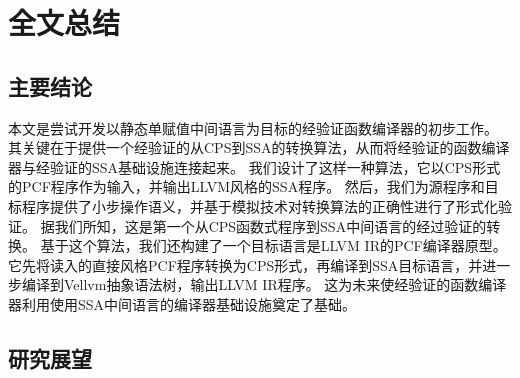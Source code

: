 
\chapter{全文总结} \label{ch:summary}

\section{主要结论}

本文是尝试开发以静态单赋值中间语言为目标的经验证函数编译器的初步工作。
其关键在于提供一个经验证的从CPS到SSA的转换算法，从而将经验证的函数编译器与经验证的SSA基础设施连接起来。
我们设计了这样一种算法，它以CPS形式的PCF程序作为输入，并输出LLVM风格的SSA程序。
然后，我们为源程序和目标程序提供了小步操作语义，并基于模拟技术对转换算法的正确性进行了形式化验证。
据我们所知，这是第一个从CPS函数式程序到SSA中间语言的经过验证的转换。
基于这个算法，我们还构建了一个目标语言是LLVM IR的PCF编译器原型。
它先将读入的直接风格PCF程序转换为CPS形式，再编译到SSA目标语言，并进一步编译到Vellvm抽象语法树，输出LLVM IR程序。
这为未来使经验证的函数编译器利用使用SSA中间语言的编译器基础设施奠定了基础。

\section{研究展望}
